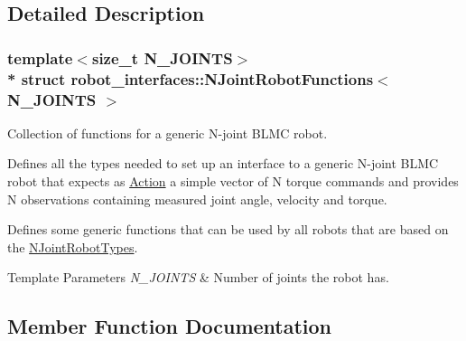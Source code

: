 \subsection{Detailed Description}
\subsubsection*{template$<$size\+\_\+t N\+\_\+\+J\+O\+I\+N\+TS$>$\\*
struct robot\+\_\+interfaces\+::\+N\+Joint\+Robot\+Functions$<$ N\+\_\+\+J\+O\+I\+N\+T\+S $>$}

Collection of functions for a generic N-\/joint B\+L\+MC robot. 

Defines all the types needed to set up an interface to a generic N-\/joint B\+L\+MC robot that expects as \hyperlink{classAction}{Action} a simple vector of N torque commands and provides N observations containing measured joint angle, velocity and torque.

Defines some generic functions that can be used by all robots that are based on the {\ttfamily \hyperlink{structrobot__interfaces_1_1NJointRobotTypes}{N\+Joint\+Robot\+Types}}.


\begin{DoxyTemplParams}{Template Parameters}
{\em N\+\_\+\+J\+O\+I\+N\+TS} & Number of joints the robot has. \\
\hline
\end{DoxyTemplParams}


\subsection{Member Function Documentation}
